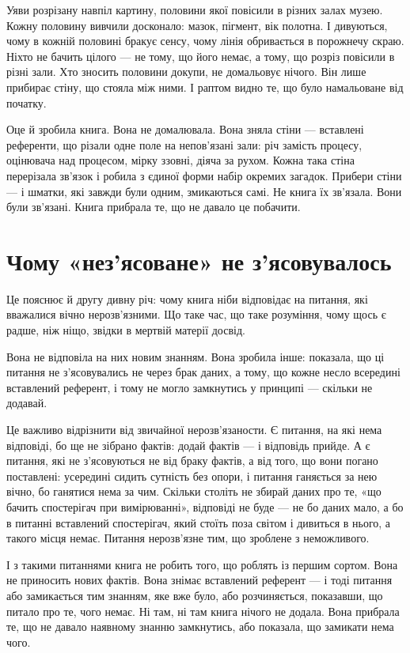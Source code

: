 \documentclass[12pt, a4paper, openany]{book}
\begin{document}
\begin{analogybox}
Уяви розрізану навпіл картину, половини якої повісили в різних залах музею. Кожну половину вивчили досконало: мазок, пігмент, вік полотна. І дивуються, чому в кожній половині бракує сенсу, чому лінія обривається в порожнечу скраю. Ніхто не бачить цілого --- не тому, що його немає, а тому, що розріз повісили в різні зали. Хто зносить половини докупи, не домальовує нічого. Він лише прибирає стіну, що стояла між ними. І раптом видно те, що було намальоване від початку.
\end{analogybox}

Оце й зробила книга. Вона не домалювала. Вона зняла стіни --- вставлені референти, що різали одне поле на непов'язані зали: річ замість процесу, оцінювача над процесом, мірку ззовні, діяча за рухом. Кожна така стіна перерізала зв'язок і робила з єдиної форми набір окремих загадок. Прибери стіни --- і шматки, які завжди були одним, змикаються самі. Не книга їх зв'язала. Вони були зв'язані. Книга прибрала те, що не давало це побачити.

\section{Чому «нез'ясоване» не з'ясовувалось}

Це пояснює й другу дивну річ: чому книга ніби відповідає на питання, які вважалися вічно нерозв'язними. Що таке час, що таке розуміння, чому щось є радше, ніж ніщо, звідки в мертвій матерії досвід.

Вона не відповіла на них новим знанням. Вона зробила інше: показала, що ці питання не з'ясовувались не через брак даних, а тому, що кожне несло всередині вставлений референт, і тому не могло замкнутись у принципі --- скільки не додавай.

Це важливо відрізнити від звичайної нерозв'язаности. Є питання, на які нема відповіді, бо ще не зібрано фактів: додай фактів --- і відповідь прийде. А є питання, які не з'ясовуються не від браку фактів, а від того, що вони погано поставлені: усередині сидить сутність без опори, і питання ганяється за нею вічно, бо ганятися нема за чим. Скільки століть не збирай даних про те, «що бачить спостерігач при вимірюванні», відповіді не буде --- не бо даних мало, а бо в питанні вставлений спостерігач, який стоїть поза світом і дивиться в нього, а такого місця немає. Питання нерозв'язне тим, що зроблене з неможливого.

І з такими питаннями книга не робить того, що роблять із першим сортом. Вона не приносить нових фактів. Вона знімає вставлений референт --- і тоді питання або замикається тим знанням, яке вже було, або розчиняється, показавши, що питало про те, чого немає. Ні там, ні там книга нічого не додала. Вона прибрала те, що не давало наявному знанню замкнутись, або показала, що замикати нема чого.
\end{document}

